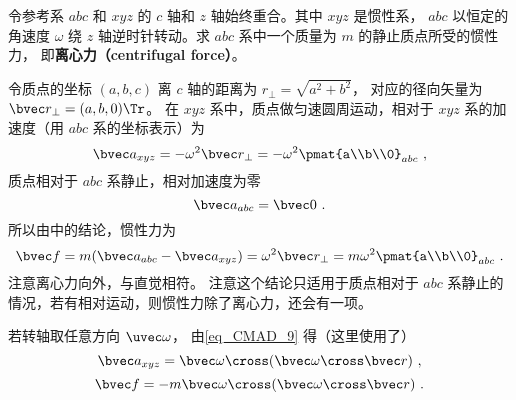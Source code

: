 
令参考系 $abc$ 和 $xyz$ 的 $c$ 轴和 $z$ 轴始终重合。其中 $xyz$ 是惯性系， $abc$ 以恒定的角速度 $\omega$ 绕 $z$ 轴逆时针转动。求 $abc$ 系中一个质量为 $m$ 的静止质点所受的惯性力， 即\textbf{离心力（centrifugal force）}。

令质点的坐标 $(a,b,c)$ 离 $c$ 轴的距离为 $r_\bot = \sqrt{a^2 + b^2}$， 对应的径向矢量为 $\bvec r_\bot = (a,b,0)\Tr$。 在 $xyz$ 系中，质点做匀速圆周运动，相对于 $xyz$ 系的加速度（用 $abc$ 系的坐标表示）为
\begin{equation}
\bvec a_{xyz} =  - \omega ^2 \bvec r_\bot =  - \omega ^2 \pmat{a\\b\\0}_{abc}~,
\end{equation}
质点相对于 $abc$ 系静止，相对加速度为零
\begin{equation}
\bvec a_{abc} = \bvec 0~.
\end{equation}
所以由中的结论，惯性力为
\begin{equation}\label{eq_Centri_3}
\bvec f = m(\bvec a_{abc} - \bvec a_{xyz}) = \omega^2\bvec r_\bot = m\omega ^2\pmat{a\\b\\0}_{abc}~.
\end{equation}
注意离心力向外，与直觉相符。 注意这个结论只适用于质点相对于 $abc$ 系静止的情况，若有相对运动，则惯性力除了离心力，还会有一项。

若转轴取任意方向 $\uvec\omega$， 由\autoref{eq_CMAD_9}  得（这里使用了）
\begin{equation}
\bvec a_{xyz} = \bvec\omega\cross (\bvec\omega\cross\bvec r)~,
\end{equation}
\begin{equation}\label{eq_Centri_5}
\bvec f = -m\bvec\omega\cross (\bvec\omega\cross\bvec r)~.
\end{equation}

